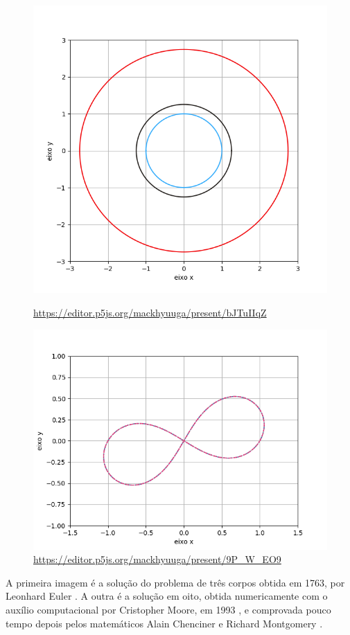 \documentclass[a4paper.12pt]{article}
\begin{document}
	\begin{figure}[H]
		\includegraphics[scale=0.5]{Figure_1.png}
		\label{figura_1}
		\caption{\url{https://editor.p5js.org/mackhyuuga/present/bJTuIIqZ}}
		\includegraphics[scale=0.5]{Figure_2.png}
		\caption{\url{https://editor.p5js.org/mackhyuuga/present/9P_W_EO9}}
	\end{figure}
	
	A primeira imagem é a solução do problema de três corpos obtida em 1763, por Leonhard Euler \cite{euler1767motu}. A outra é a solução em oito, obtida numericamente com o auxílio computacional por Cristopher Moore, em 1993 \cite{moore}, e comprovada pouco tempo depois pelos matemáticos Alain Chenciner e Richard Montgomery \cite{chenciner2000mathematics}.
	
\end{document}
